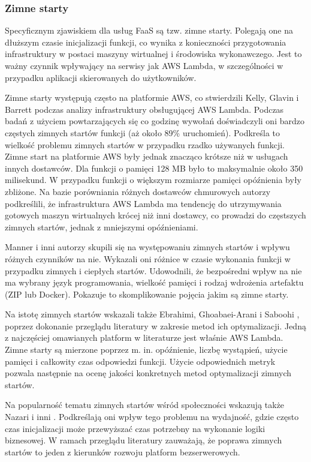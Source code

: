 \subsubsection*{Zimne starty}

Specyficznym zjawiskiem dla usług FaaS są tzw. zimne starty. 
Polegają one na dłuższym czasie inicjalizacji funkcji, co wynika z konieczności przygotowania infrastruktury w postaci maszyny wirtualnej i środowiska wykonawczego. 
Jest to ważny czynnik wpływający na serwisy jak AWS Lambda, w szczególności w przypadku aplikacji skierowanych do użytkowników.

Zimne starty występują często na platformie AWS, co stwierdzili Kelly, Glavin i Barrett \cite{9284261} podczas analizy infrastruktury obsługującej AWS Lambda. 
Podczas badań z użyciem powtarzających się co godzinę wywołań doświadczyli oni bardzo częstych zimnych startów funkcji (aż około 89\% uruchomień). 
Podkreśla to wielkość problemu zimnych startów w przypadku rzadko używanych funkcji. 
Zimne start na platformie AWS były jednak znacząco krótsze niż w usługach innych dostawców. 
Dla funkcji o pamięci 128 MB było to maksymalnie około 350 milisekund. 
W przypadku funkcji o większym rozmiarze pamięci opóźnienia były zbliżone. 
Na bazie porówniania różnych dostawców chmurowych autorzy podkreślili, że infrastruktura AWS Lambda ma tendencję do utrzymywania gotowych maszyn wirtualnych krócej niż inni dostawcy, co prowadzi do częstszych zimnych startów, jednak z mniejszymi opóźnieniami.

Manner i inni autorzy \cite{8605777} skupili się na występowaniu zimnych startów i wpływu różnych czynników na nie. 
Wykazali oni różnice w czasie wykonania funkcji w przypadku zimnych i ciepłych startów. 
Udowodnili, że bezpośredni wpływ na nie ma wybrany język programowania, wielkość pamięci i rodzaj wdrożenia artefaktu (ZIP lub Docker). 
Pokazuje to skomplikowanie pojęcia jakim są zimne starty.

Na istotę zimnych startów wskazali także Ebrahimi, Ghoabaei-Arani i Saboohi \cite{EBRAHIMI2024103115}, poprzez dokonanie przeglądu literatury w zakresie metod ich optymalizacji. 
Jedną z najczęściej omawianych platform w literaturze jest właśnie AWS Lambda. 
Zimne starty są mierzone poprzez m. in. opóźnienie, liczbę wystąpień, użycie pamięci i całkowity czas odpowiedzi funkcji. 
Użycie odpowiednich metryk pozwala następnie na ocenę jakości konkretnych metod optymalizacji zimnych startów.

Na popularność tematu zimnych startów wśród społeczności wskazują także Nazari i inni \cite{9732138}.
Podkreślają oni wpływ tego problemu na wydajność, gdzie często czas inicjalizacji może przewyższać czas potrzebny na wykonanie logiki biznesowej.
W ramach przeglądu literatury zauważają, że poprawa zimnych startów to jeden z kierunków rozwoju platform bezserwerowych.

